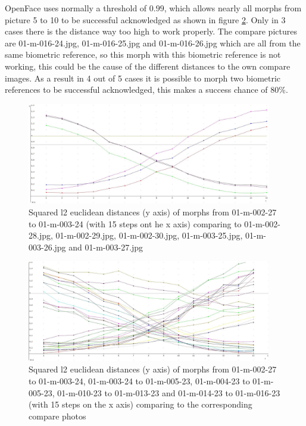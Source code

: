 OpenFace uses normally a threshold of \textbf{$0.99$}, which allows nearly all morphs from picture 5 to 10 to be successful acknowledged as shown in figure \ref{fig:Result1-5}. Only in 3 cases there is the distance way too high to work properly. The compare pictures are 01-m-016-24.jpg, 01-m-016-25.jpg and 01-m-016-26.jpg which are all from the same biometric reference, so this morph with this biometric reference is not working, this could be the cause of the different distances to the own compare images. As a result in 4 out of 5 cases it is possible to morph two biometric references to be successful acknowledged, this makes a success chance of $80$\%.

\begin{figure}[htbp] 
	\centering
		\includegraphics[width=0.95\textwidth]{Resources/result1.jpg}
	\caption{Squared l2 euclidean distances (y axis) of morphs from 01-m-002-27 to 01-m-003-24 (with 15 steps ont he x axis) comparing to 01-m-002-28.jpg, 01-m-002-29.jpg, 01-m-002-30.jpg, 01-m-003-25.jpg, 01-m-003-26.jpg and 01-m-003-27.jpg}
	\label{fig:Result1}
\end{figure}

\begin{figure}[htbp] 
	\centering
		\includegraphics[width=0.95\textwidth]{Resources/result1-5.jpg}
	\caption{Squared l2 euclidean distances (y axis) of morphs from 01-m-002-27 to 01-m-003-24, 01-m-003-24 to 01-m-005-23, 01-m-004-23 to 01-m-005-23, 01-m-010-23 to 01-m-013-23 and 01-m-014-23 to 01-m-016-23 (with 15 steps on the x axis) comparing to the corresponding compare photos}
	\label{fig:Result1-5}
\end{figure}

